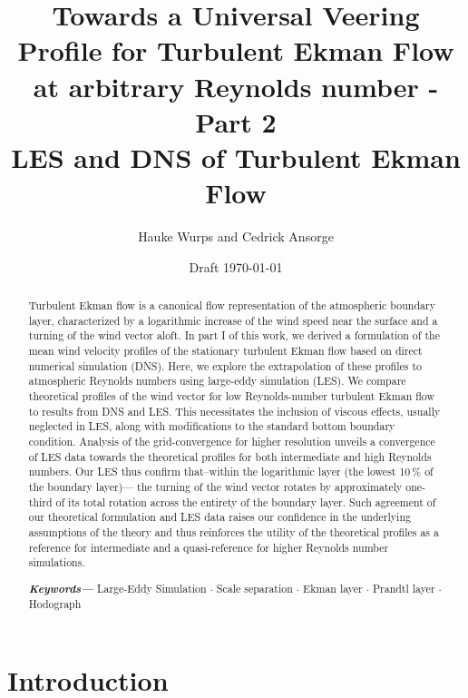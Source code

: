 \documentclass[draft,a4paper,11pt]{article}
\author{Hauke Wurps and Cedrick Ansorge}
\date{Draft \today}
\title{Towards a Universal Veering Profile for Turbulent Ekman Flow at arbitrary Reynolds number - Part 2\\
  \normalsize LES and DNS of Turbulent Ekman Flow \\}
\providecommand{\keywords}[1]
{
  \small	
  \textbf{\textit{Keywords---}} #1
}
\begin{document}
 

\maketitle

\begin{abstract}
  Turbulent Ekman flow is a canonical flow representation of the atmospheric boundary layer, characterized by a logarithmic increase of the wind speed near the surface and a turning of the wind vector aloft. In part I of this work, we derived a formulation of the mean wind velocity profiles of the stationary turbulent Ekman flow based on direct numerical simulation (DNS). Here, we explore the extrapolation of these profiles to atmospheric Reynolds numbers using large-eddy simulation (LES).
  We compare theoretical profiles of the wind vector for low Reynolds-number turbulent Ekman flow to results from DNS and LES. This necessitates the inclusion of viscous effects, usually neglected in LES, along with modifications to the standard bottom boundary condition.
  Analysis of the grid-convergence for higher resolution unveils a convergence of LES data towards the theoretical profiles for both intermediate and high Reynolds numbers. Our LES thus confirm that--within the logarithmic layer (the lowest 10\,\% of the boundary layer)--- the turning of the wind vector rotates by approximately one-third of its total rotation across the entirety of the boundary layer.
  Such agreement of our theoretical formulation and LES data raises our confidence in the underlying assumptions of the theory and thus reinforces the utility of the theoretical profiles as a reference for intermediate and a quasi-reference for higher Reynolds number simulations.
%


\keywords{Large-Eddy Simulation $\cdot$ Scale separation $\cdot$ Ekman layer $\cdot$ Prandtl layer $\cdot$ Hodograph}
\end{abstract}
%
%
\section{Introduction}
\end{document}
